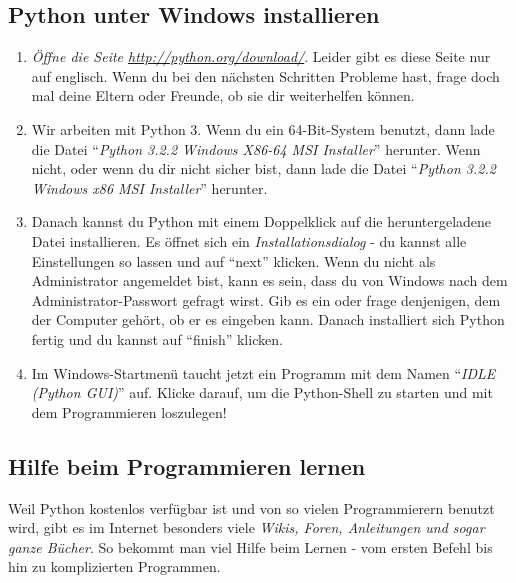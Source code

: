 	\subsection*{Python unter Windows installieren}
	\begin{enumerate}
		\item \emph{Öffne die Seite \url{http://python.org/download/}}. Leider gibt es diese Seite nur auf englisch. Wenn du bei den nächsten Schritten Probleme hast, frage doch mal deine Eltern oder Freunde, ob sie dir weiterhelfen können.
		
		\item Wir arbeiten mit Python 3. Wenn du ein 64-Bit-System benutzt, dann lade die Datei \enquote{\emph{Python 3.2.2 Windows X86-64 MSI Installer}} herunter. Wenn nicht, oder wenn du dir nicht sicher bist, dann lade die Datei \enquote{\emph{Python 3.2.2 Windows x86 MSI Installer}} herunter.
		
		\item Danach kannst du Python mit einem Doppelklick auf die heruntergeladene Datei installieren. Es öffnet sich ein \emph{Installationsdialog} - du kannst alle Einstellungen so lassen und auf \enquote{next} klicken. Wenn du nicht als Administrator angemeldet bist, kann es sein, dass du von Windows nach dem Administrator-Passwort gefragt wirst. Gib es ein oder frage denjenigen, dem der Computer gehört, ob er es eingeben kann. Danach installiert sich Python fertig und du kannst auf \enquote{finish} klicken.
		
		\item Im Windows-Startmenü taucht jetzt ein Programm mit dem Namen \enquote{\emph{IDLE (Python GUI)}} auf. Klicke darauf, um die Python-Shell zu starten und mit dem Programmieren loszulegen!
	\end{enumerate}
	
	\subsection*{Hilfe beim Programmieren lernen}
	Weil Python kostenlos verfügbar ist und von so vielen Programmierern benutzt wird, gibt es im Internet besonders viele \emph{Wikis, Foren, Anleitungen und sogar ganze Bücher}. So bekommt man viel Hilfe beim Lernen - vom ersten Befehl bis hin zu komplizierten Programmen.
	

